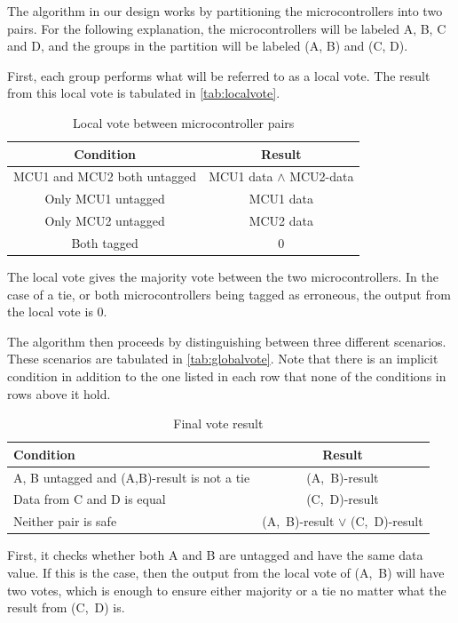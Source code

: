 The algorithm in our design works by partitioning the microcontrollers
into two pairs. For the following explanation, the microcontrollers
will be labeled A, B, C and D, and the groups in the partition will be
labeled (A, B) and (C, D).

First, each group performs what will be referred to as a local
vote. The result from this local vote is tabulated in
\autoref{tab:localvote}.

\begin{table}[htbp]
  \centering
  \caption{Local vote between microcontroller pairs}
  \begin{tabular}{|c|c|}
    \hline
    \textbf{Condition} & \textbf{Result} \\ \hline
    MCU1 and MCU2 both untagged & MCU1 data $\wedge$ MCU2-data \\ \hline
    Only MCU1 untagged & MCU1 data \\ \hline
    Only MCU2 untagged & MCU2 data \\ \hline
    Both tagged   & 0 \\ \hline
  \end{tabular}
  \label{tab:localvote}
\end{table}

The local vote gives the majority vote between the two
microcontrollers. In the case of a tie, or both microcontrollers being
tagged as erroneous, the output from the local vote is 0. 

The algorithm then proceeds by distinguishing between three different
scenarios. These scenarios are tabulated in
\autoref{tab:globalvote}. Note that there is an implicit condition in
addition to the one listed in each row that none of the conditions in
rows above it hold.

\begin{table}[htbp]
  \centering
  \caption{Final vote result}
  \begin{tabular}{|p{7cm}|c|}
    \hline
    \textbf{Condition} & \textbf{Result} \\ \hline
    A, B untagged and (A,B)-result is not a tie & (A,~B)-result \\ \hline
    Data from C and D is equal & (C,~D)-result \\ \hline
    Neither pair is safe  & (A,~B)-result $\vee$ (C,~D)-result \\ \hline
  \end{tabular}
  \label{tab:globalvote}
\end{table}

First, it checks whether both A and B are untagged and have the same
data value. If this is the case, then the output from the local vote
of (A,~B) will have two votes, which is enough to ensure either
majority or a tie no matter what the result from (C,~D) is.


